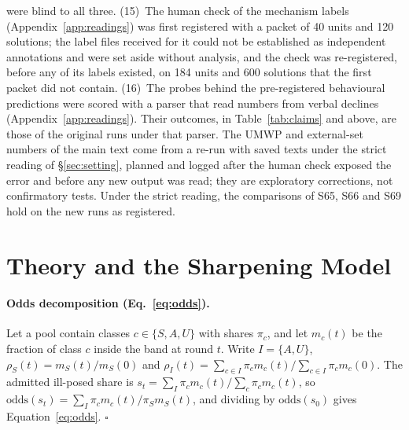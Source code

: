 were blind to all three. (15)~The human check of the mechanism labels (Appendix~\ref{app:readings}) was first registered with a packet of 40 units and 120 solutions; the label files received for it could not be established as independent annotations and were set aside without analysis, and the check was re-registered, before any of its labels existed, on 184 units and 600 solutions that the first packet did not contain. (16)~The probes behind the pre-registered behavioural predictions were scored with a parser that read numbers from verbal declines (Appendix~\ref{app:readings}). Their outcomes, in Table~\ref{tab:claims} and above, are those of the original runs under that parser. The UMWP and external-set numbers of the main text come from a re-run with saved texts under the strict reading of \S\ref{sec:setting}, planned and logged after the human check exposed the error and before any new output was read; they are exploratory corrections, not confirmatory tests. Under the strict reading, the comparisons of S65, S66 and S69 hold on the new runs as registered.

\FloatBarrier
\section{Theory and the Sharpening Model}
\label{app:theory}

\paragraph{Odds decomposition (Eq.~\ref{eq:odds}).} Let a pool contain classes $c \in \{S, A, U\}$ with shares $\pi_c$, and let $m_c(t)$ be the fraction of class $c$ inside the band at round $t$. Write $I = \{A, U\}$, $\rho_S(t) = m_S(t)/m_S(0)$ and $\rho_I(t) = \sum_{c \in I} \pi_c m_c(t) / \sum_{c \in I} \pi_c m_c(0)$. The admitted ill-posed share is $s_t = \sum_I \pi_c m_c(t) / \sum_c \pi_c m_c(t)$, so $\mathrm{odds}(s_t) = \sum_I \pi_c m_c(t) / \pi_S m_S(t)$, and dividing by $\mathrm{odds}(s_0)$ gives Equation~\ref{eq:odds}. $\square$

